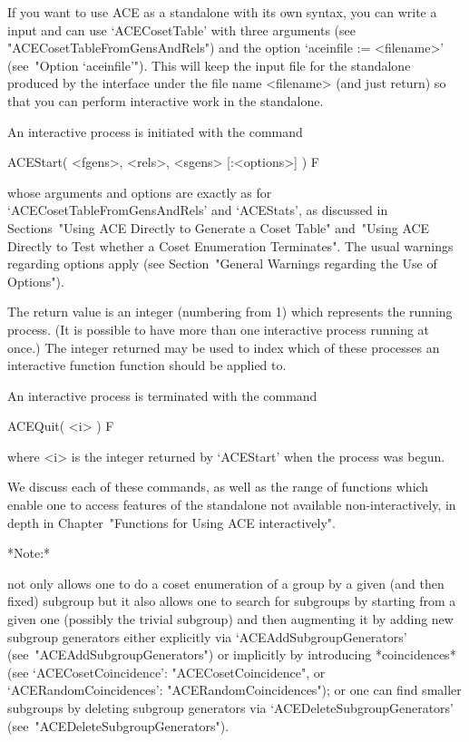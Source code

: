 \enditems


If you want to use ACE as a standalone with its own  syntax,  you  can
write a {\GAP} input and can use `ACECosetTable' with three  arguments
(see "ACECosetTableFromGensAndRels")  and  the  option  `aceinfile  :=
<filename>' (see~"Option `aceinfile'"). This will keep the input  file
for the {\ACE} standalone produced by the {\GAP} interface  under  the
file name <filename>  (and  just  return)  so  that  you  can  perform
interactive work in the standalone.


\beginitems

An interactive {\ACE} process is initiated with the command

\>ACEStart( <fgens>, <rels>, <sgens> [:<options>] ) F

whose    arguments    and    options    are     exactly     as     for
`ACECosetTableFromGensAndRels'  and  `ACEStats',   as   discussed   in
Sections~"Using ACE Directly to Generate a Coset Table" and~"Using ACE
Directly to Test whether a Coset Enumeration  Terminates".  The  usual
warnings  regarding  options  apply  (see  Section~"General   Warnings
regarding the Use of Options").

The return value is an integer (numbering from 1) which represents the
running process. (It is possible to have  more  than  one  interactive
process running at once.) The integer returned may be  used  to  index
which of these  processes  an  interactive  function  {\ACE}  function
should be applied to.

An interactive{\ACE} process is terminated with the command

\>ACEQuit( <i> ) F

where <i> is the integer returned by `ACEStart' when the  process  was
begun.

We discuss each of these commands, as well as the range  of  functions
which enable one to access  features  of  the  {\ACE}  standalone  not
available non-interactively, in depth in Chapter~"Functions for  Using
ACE interactively".

\enditems

*Note:*

{\ACE} not only allows one to do a coset enumeration of a group  by  a
given (and then fixed) subgroup but it also allows one to  search  for
subgroups by starting from a given one (possibly the trivial subgroup)
and then augmenting  it  by  adding  new  subgroup  generators  either
explicitly               via                `ACEAddSubgroupGenerators'
(see~"ACEAddSubgroupGenerators")   or   implicitly   by    introducing
*coincidences*     (see     `ACECosetCoincidence':
"ACECosetCoincidence",           or           `ACERandomCoincidences':
"ACERandomCoincidences");  or  one  can  find  smaller  subgroups   by
deleting   subgroup   generators   via   `ACEDeleteSubgroupGenerators'
(see~"ACEDeleteSubgroupGenerators").


